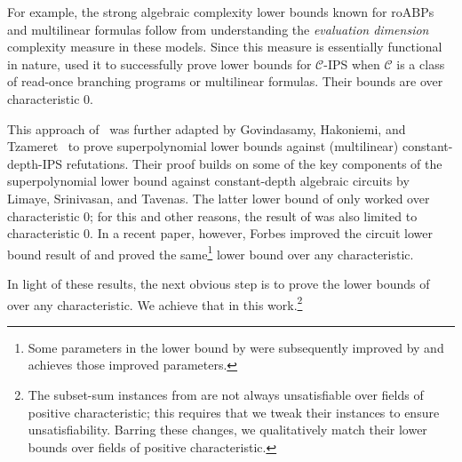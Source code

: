 \documentclass[11pt]{article}
\renewcommand{\comment}[2]{\marginpar{\tiny{\textbf{#1: }\textit{#2}}}}
\newcommand{\snote}[1]{\comment{SS}{#1}}
\newcommand{\roABP}{\mathrm{roABP}}
\newcommand{\ACz}{\text{AC}^0}
\begin{document}
For example, the strong algebraic complexity lower bounds known for $\roABP$s \cite{Nisan} and multilinear formulas \cite{Raz-2009} follow from understanding the \emph{evaluation dimension} complexity measure in these models. Since this measure is essentially functional in nature, \cite{FSTW21} used it to successfully prove lower bounds for $\mathcal{C}$-IPS when $\mathcal{C}$ is a class of read-once branching programs or multilinear formulas. Their bounds are over characteristic $0$.  







This approach of~\cite{FSTW21} was further adapted by Govindasamy, Hakoniemi, and Tzameret~\cite{GHT} to prove superpolynomial lower bounds against (multilinear) constant-depth-IPS refutations. Their proof builds on some of the key components of the superpolynomial lower bound against constant-depth algebraic circuits by Limaye, Srinivasan, and Tavenas. The latter lower bound of \cite{LST} only worked over characteristic $0$; for this and other reasons, the result of \cite{GHT} was also limited to characteristic $0$. In a recent paper, however, Forbes \cite{Forbes-LST-CCC} improved the circuit lower bound result of \cite{LST} and proved the same\footnote{Some parameters in the lower bound by \cite{LST} were subsequently improved by \cite{BDS24} and \cite{Forbes-LST-CCC} achieves those improved parameters.} lower bound over any characteristic. 

In light of these results, the next obvious step is to prove the lower bounds of~\cite{FSTW21,GHT} over any characteristic. We achieve that in this work.\footnote{The subset-sum instances from \cite{FSTW21,GHT} are not always unsatisfiable over fields of positive characteristic; this requires that we tweak their instances to ensure unsatisfiability. Barring these changes, we qualitatively match their lower bounds over fields of positive characteristic.}
\end{document}
